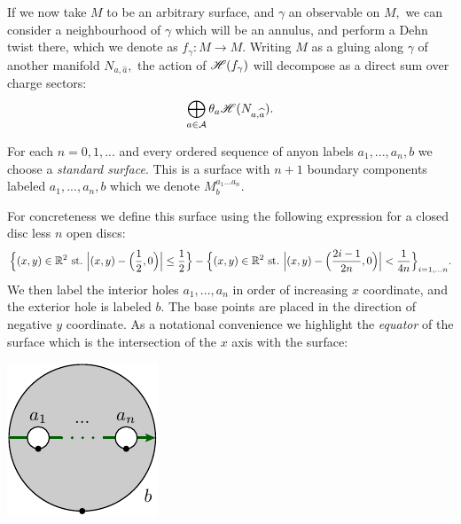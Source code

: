 If we now take $M$ to be an arbitrary surface, and $\gamma$ an
observable on $M,$ we can consider a neighbourhood of $\gamma$
which will be an annulus, and perform a Dehn twist there,
which we denote as $f_\gamma : M\to M.$
Writing $M$ as a gluing along $\gamma$ of another
manifold $N_{a,\widehat{a}},$
the action of $\mathscr{H}(f_\gamma)$ will decompose as a direct sum over charge 
sectors:
$$
\bigoplus_{a\in\mathcal{A}} \theta_a \mathscr{H}(N_{a,\widehat{a}}).
$$

\newcommand{\StdM}{M^{a_1...a_n}_{b}}

For each $n=0,1,...$ and every ordered sequence of
anyon labels $a_1,...,a_n,b$ we choose a \emph{standard surface}.
This is a surface with
$n+1$ boundary components labeled $a_1,...,a_n,{b}$ 
which we denote $\StdM.$ 

For concreteness
we define this surface using the following 
expression for a closed disc less $n$ open discs:
$$
\Bigl\{(x,y)\in\R^2 \ \mathrm{st.}\  \Bigl|(x,y)-\Bigl(\frac{1}{2},0\Bigr)\Bigr|\le \frac{1}{2}\Bigr\} -
\Bigl\{(x,y)\in\R^2 \ \mathrm{st.}\  \Bigl|(x,y)-\Bigl(\frac{2i-1}{2n},0\Bigr)\Bigr| < \frac{1}{4n}\Bigr\}_{i=1,...n}.
$$
We then label the interior holes $a_1,...,a_n$ in order of
increasing $x$ coordinate, and the exterior hole is labeled $b$.
The base points are placed in the direction of negative $y$ coordinate.
As a notational convenience we highlight the \emph{equator}
of the surface %
which is the intersection of
the $x$ axis with the surface:
\begin{center}
\includegraphics[]{pic-disc-standard.pdf}
\end{center}

